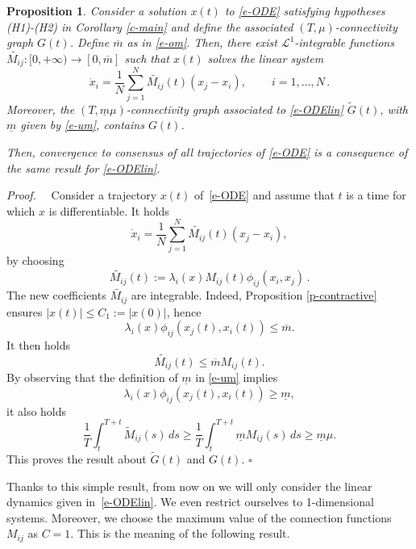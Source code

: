 \documentclass[journal]{article}
\newtheorem{proposition}[lemma]{Proposition}
\newenvironment{proof}{{\it Proof.}~~}{\hfill$\square$}
\newcommand{\ctr}[2]{M_{#1#2}}
\begin{document}
 \begin{proposition}\label{p:non-lin} 
 Consider a solution $x(t)$ to \eqref{e-ODE} satisfying hypotheses (H1)-(H2) in Corollary \ref{c-main} and define the associated $(T,\mu)$-connectivity graph $G(t)$. Define $\overline{m}$ as in \eqref{e-om}. Then, there exist $\mathscr{L}^1$-integrable functions $\widetilde{\ctr{i}{j}}:[0,+\infty)\to[0,\overline{m}]$ such that $x(t)$ solves the linear system
 \begin{equation}
\label{e-ODElin}
	\dot x_{i}=\frac{1}{N}\sum_{j=1}^{N} \widetilde{M_{ij}}(t)\left(x_{j}-x_{i}\right),\qquad \ i=1,\dots,N\,.
 \end{equation}
Moreover, the $(T,\underline{m} \mu)$-connectivity graph associated to \eqref{e-ODElin} $\tilde G(t)$, with $\underline{m}$ given by \eqref{e-um}, contains $G(t)$.


Then, convergence to consensus of all trajectories of \eqref{e-ODE} is a consequence of the same result for \eqref{e-ODElin}.
\end{proposition}
\begin{proof}
 Consider a trajectory $x(t)$ of~\eqref{e-ODE} and assume that $t$ is a time for which $x$ is differentiable. It holds $$\dot x_i= \frac{1}{N}\sum_{j=1}^{N} \widetilde{M_{ij}}(t)\left(x_{j}-x_{i}\right),$$
 by choosing $$\widetilde{M_{ij}}(t):=\lambda_i(x) M_{ij}(t)\phi_{ij}(x_i,x_j)\,.
 $$
 The new coefficients $ \widetilde{M_{ij}}$ are integrable. Indeed, Proposition \ref{p-contractive} ensures $|x(t)|\leq C_1:=|x(0)|$, hence $$\lambda_i(x)\phi_{ij}(x_j(t),x_i(t))\leq \overline{m}.$$
 It then holds 
 $$  \widetilde{M_{ij}}(t)\leq \overline{m} {M_{ij}}(t).$$
 By observing that the definition of $\underline{m}$ in \eqref{e-um} implies 
 $$\lambda_i(x)\phi_{ij}(x_j(t),x_i(t))\geq \underline{m},$$
 it also holds $$\frac1T \int_t^{T+t} \tilde M_{ij}(s)\, ds\geq \frac1T \int_t^{T+t} \underline{m} M_{ij}(s)\, ds\geq \underline{m} \mu.$$
 This proves the result about $\tilde G(t)$ and  $G(t)$. 
 \end{proof}

Thanks to this simple result, from now on we will only consider the linear dynamics given in~\eqref{e-ODElin}. 
We even restrict ourselves to 1-dimensional systems. Moreover, we choose the maximum value of the connection functions $M_{ij}$ as $C=1$. This is the meaning of the following result.
\end{document}
